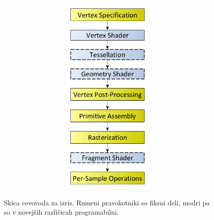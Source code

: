 \documentclass[a4paper, 12pt]{book}
\begin{document}
\begin{figure}[h]
\begin{center}
\includegraphics[width=12cm, height=10cm, keepaspectratio=true]{File_RenderingPipeline.png}
\end{center}
\protect\cite{renderingpipelineoverview}
\caption{Skica cevovoda za izris. Rumeni pravokotniki so fiksni deli, modri pa so v novejših različicah programabilni.}
\label{filerenderingpipeline}
\end{figure}
\end{document}
